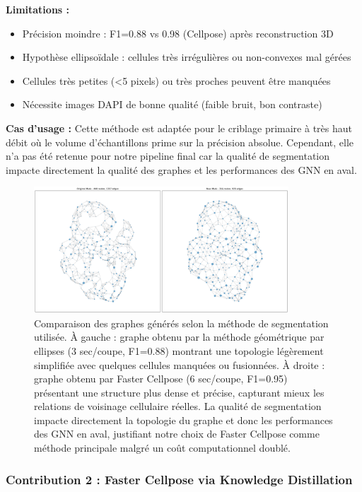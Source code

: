 \textbf{Limitations :}
\begin{itemize}
    \item Précision moindre : F1=0.88 vs 0.98 (Cellpose) après reconstruction 3D
    \item Hypothèse ellipsoïdale : cellules très irrégulières ou non-convexes mal gérées
    \item Cellules très petites (<5 pixels) ou très proches peuvent être manquées
    \item Nécessite images DAPI de bonne qualité (faible bruit, bon contraste)
\end{itemize}

\textbf{Cas d'usage :}
Cette méthode est adaptée pour le criblage primaire à très haut débit où le volume d'échantillons prime sur la précision absolue. Cependant, elle n'a pas été retenue pour notre pipeline final car la qualité de segmentation impacte directement la qualité des graphes et les performances des GNN en aval.

\begin{figure}[htbp]
    \centering
    \includegraphics[width=0.85\textwidth]{../img/graph_comparison.png}
    \caption{Comparaison des graphes générés selon la méthode de segmentation utilisée. À gauche : graphe obtenu par la méthode géométrique par ellipses (3 sec/coupe, F1=0.88) montrant une topologie légèrement simplifiée avec quelques cellules manquées ou fusionnées. À droite : graphe obtenu par Faster Cellpose (6 sec/coupe, F1=0.95) présentant une structure plus dense et précise, capturant mieux les relations de voisinage cellulaire réelles. La qualité de segmentation impacte directement la topologie du graphe et donc les performances des GNN en aval, justifiant notre choix de Faster Cellpose comme méthode principale malgré un coût computationnel doublé.}
    \label{fig:graph_comparison}
\end{figure}

\subsubsection{Contribution 2 : Faster Cellpose via Knowledge Distillation}

